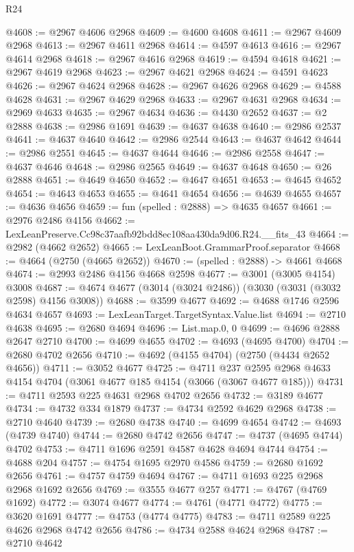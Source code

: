 \begin{lexlean}{R24}
\begin{coremodule}
@4608 := @2967 @4606 @2968
@4609 := @4600 @4608
@4611 := @2967 @4609 @2968
@4613 := @2967 @4611 @2968
@4614 := @4597 @4613
@4616 := @2967 @4614 @2968
@4618 := @2967 @4616 @2968
@4619 := @4594 @4618
@4621 := @2967 @4619 @2968
@4623 := @2967 @4621 @2968
@4624 := @4591 @4623
@4626 := @2967 @4624 @2968
@4628 := @2967 @4626 @2968
@4629 := @4588 @4628
@4631 := @2967 @4629 @2968
@4633 := @2967 @4631 @2968
@4634 := @2969 @4633
@4635 := @2967 @4634
@4636 := @4430 @2652
@4637 := @2 @2888
@4638 := @2986 @1691
@4639 := @4637 @4638
@4640 := @2986 @2537
@4641 := @4637 @4640
@4642 := @2986 @2544
@4643 := @4637 @4642
@4644 := @2986 @2551
@4645 := @4637 @4644
@4646 := @2986 @2558
@4647 := @4637 @4646
@4648 := @2986 @2565
@4649 := @4637 @4648
@4650 := @26 @2888
@4651 := @4649 @4650
@4652 := @4647 @4651
@4653 := @4645 @4652
@4654 := @4643 @4653
@4655 := @4641 @4654
@4656 := @4639 @4655
@4657 := @4636 @4656
@4659 := fun (spelled : @2888) => @4635 @4657
@4661 := @2976 @2486 @4156
@4662 := LexLeanPreserve.Cc98c37aafb92bdd8ec108aa430da9d06.R24.__fits_43
@4664 := @2982 (@4662 @2652)
@4665 := LexLeanBoot.GrammarProof.separator
@4668 := @4664 (@2750 (@4665 @2652))
@4670 := (spelled : @2888) -> @4661 @4668
@4674 := @2993 @2486 @4156 @4668 @2598
@4677 := @3001 (@3005 @4154) @3008
@4687 := @4674 @4677 (@3014 (@3024 @2486)) (@3030 (@3031 (@3032 @2598) @4156 @3008))
@4688 := @3599 @4677
@4692 := @4688 @1746 @2596 @4634 @4657
@4693 := LexLeanTarget.TargetSyntax.Value.list
@4694 := @2710 @4638
@4695 := @2680 @4694
@4696 := List.map.{0, 0}
@4699 := @4696 @2888 @2647 @2710
@4700 := @4699 @4655
@4702 := @4693 (@4695 @4700)
@4704 := @2680 @4702 @2656
@4710 := @4692 (@4155 @4704) (@2750 (@4434 @2652 @4656))
@4711 := @3052 @4677
@4725 := @4711
    @237
    @2595
    @2968
    @4633
    @4154
    @4704
    (@3061 @4677 @185 @4154 (@3066 (@3067 @4677 @185)))
@4731 := @4711 @2593 @225 @4631 @2968 @4702 @2656
@4732 := @3189 @4677
@4734 := @4732 @334 @1879
@4737 := @4734 @2592 @4629 @2968
@4738 := @2710 @4640
@4739 := @2680 @4738
@4740 := @4699 @4654
@4742 := @4693 (@4739 @4740)
@4744 := @2680 @4742 @2656
@4747 := @4737 (@4695 @4744) @4702
@4753 := @4711 @1696 @2591 @4587 @4628 @4694 @4744
@4754 := @4688 @204
@4757 := @4754 @1695 @2970 @4586
@4759 := @2680 @1692 @2656
@4761 := @4757 @4759 @4694
@4767 := @4711 @1693 @225 @2968 @2968 @1692 @2656
@4769 := @3555 @4677 @257
@4771 := @4767 (@4769 @1692)
@4772 := @3074 @4677
@4774 := @4761 (@4771 @4772)
@4775 := @3620 @1691
@4777 := @4753 (@4774 @4775)
@4783 := @4711 @2589 @225 @4626 @2968 @4742 @2656
@4786 := @4734 @2588 @4624 @2968
@4787 := @2710 @4642

\end{coremodule}
\end{lexlean}
